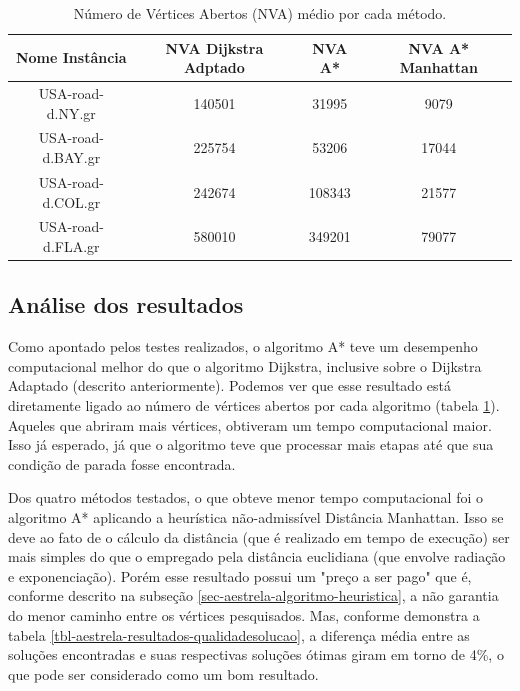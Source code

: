 \begin{table}[H]
\caption{Número de Vértices Abertos (NVA) médio por cada método.}
\label{tbl-aestrela-resultados-nva}
\centering
\begin{adjustbox}{max width=\textwidth}
\begin{tabular}{|c|c|c|c|}
\hline
\textbf{Nome Instância} & \textbf{NVA Dijkstra Adptado} & \textbf{NVA A*} & \textbf{NVA A* Manhattan} \\ \hline
USA-road-d.NY.gr        & 140501                        & 31995           & 9079                      \\ \hline
USA-road-d.BAY.gr       & 225754                        & 53206           & 17044                     \\ \hline
USA-road-d.COL.gr       & 242674                        & 108343          & 21577                     \\ \hline
USA-road-d.FLA.gr       & 580010                        & 349201          & 79077                     \\ \hline
\end{tabular} 
\end{adjustbox}
\end{table}

\subsection{Análise dos resultados}
\label{sec-aestrela-resultados-analise}
Como apontado pelos testes realizados, o algoritmo A* teve um desempenho computacional melhor do que o algoritmo Dijkstra, inclusive sobre o Dijkstra Adaptado (descrito anteriormente). Podemos ver que esse resultado está diretamente ligado ao número de vértices abertos por cada algoritmo (tabela \ref{tbl-aestrela-resultados-nva}). Aqueles que abriram mais vértices, obtiveram um tempo computacional maior. Isso já esperado, já que o algoritmo teve que processar mais etapas até que sua condição de parada fosse encontrada.

Dos quatro métodos testados, o que obteve menor tempo computacional foi o algoritmo A* aplicando a heurística não-admissível Distância Manhattan. Isso se deve ao fato de o cálculo da distância (que é realizado em tempo de execução) ser mais simples do que o empregado pela distância euclidiana (que envolve radiação e exponenciação). Porém esse resultado possui um "preço a ser pago" que é, conforme descrito na subseção \ref{sec-aestrela-algoritmo-heuristica}, a não garantia do menor caminho entre os vértices pesquisados. Mas, conforme demonstra a tabela \ref{tbl-aestrela-resultados-qualidadesolucao}, a diferença média entre as soluções encontradas e suas respectivas soluções ótimas giram em torno de 4\%, o que pode ser considerado como um bom resultado.


